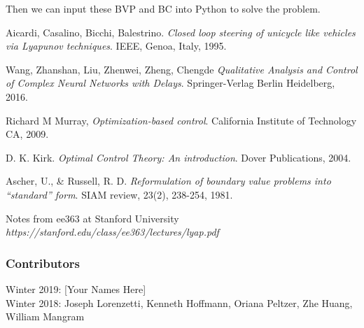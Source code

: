\documentclass[twoside]{article}
\begin{document}
Then we can input these BVP and BC into Python to solve the problem.

\begin{thebibliography}{9}
Aicardi, Casalino, Bicchi, Balestrino.
\textit{Closed loop steering of unicycle like vehicles via Lyapunov techniques}.
IEEE, Genoa, Italy, 1995.


Wang, Zhanshan, Liu, Zhenwei, Zheng, Chengde
\textit{Qualitative Analysis and Control of Complex Neural Networks with Delays}.
Springer-Verlag Berlin Heidelberg,  2016.


Richard M Murray, \textit{Optimization-based control}. California Institute of Technology CA, 2009.

D. K. Kirk. \textit{Optimal Control Theory: An introduction}. Dover Publications, 2004.

Ascher, U., \& Russell, R. D. \textit{Reformulation of boundary value problems into ``standard'' form}. SIAM review, 23(2), 238-254, 1981.

Notes from ee363 at Stanford University
\textit{https://stanford.edu/class/ee363/lectures/lyap.pdf}

\end{thebibliography}

\subsubsection*{Contributors}
Winter 2019: [Your Names Here]
\\
Winter 2018: Joseph Lorenzetti, Kenneth Hoffmann, Oriana Peltzer, Zhe Huang, William Mangram
\end{document}
